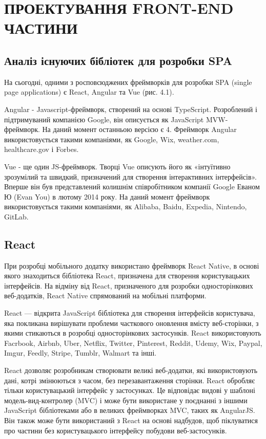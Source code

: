 \section{ПРОЕКТУВАННЯ FRONT-END ЧАСТИНИ}

\subsection{Аналіз існуючих бібліотек для розробки SPA}

На сьогодні, одними з росповсюджених фреймворків для розробки SPA (single page applications) є React, Angular та Vue (рис. 4.1).

Angular - Javascript-фреймворк, створений на основі TypeScript. Розроблений і підтримуваний компанією Google, він описується як JavaScript MVW-фреймворк. На даний момент останньою версією є 4. Фреймворк Angular використовується такими компаніями, як Google, Wix, weather.com, healthcare.gov і Forbes.

Vue - ще один JS-фреймворк. Творці Vue описують його як «інтуїтивно зрозумілий та швидкий, призначений для створення інтерактивних інтерфейсів». Вперше він був представлений колишнім співробітником компанії Google Еваном Ю (Evan You) в лютому 2014 року. На даний момент фреймворк використовується такими компаніями, як Alibaba, Baidu, Expedia, Nintendo, GitLab.

\subsection{React}

При розробці мобільного додатку використано фреймворк React Native, в основі якого знаходиться бібліотека React, призначена для створення користувацьких інтерфейсів. На відміну від React, призначеного для розробки односторінкових веб-додатків, React Native спрямований на мобільні платформи.

React — відкрита JavaScript бібліотека для створення інтерфейсів користувача, яка покликана вирішувати проблеми часткового оновлення вмісту веб-сторінки, з якими стикаються в розробці односторінкових застосунків. React використовують Facrbook, Airbnb, Uber, Netflix, Twitter, Pinterest, Reddit, Udemy, Wix, Paypal, Imgur, Feedly, Stripe, Tumblr, Walmart та інші.

React дозволяє розробникам створювати великі веб-додатки, які використовують дані, котрі змінюються з часом, без перезавантаження сторінки. React обробляє тільки користувацький інтерфейс у застосунках. Це відповідає видові у шаблоні модель-вид-контролер (MVC) і може бути використане у поєднанні з іншими JavaScript бібліотеками або в великих фреймворках MVC, таких як AngularJS. Він також може бути використаний з React на основі надбудов, щоб піклуватися про частини без користувацького інтерфейсу побудови веб-застосунків.

